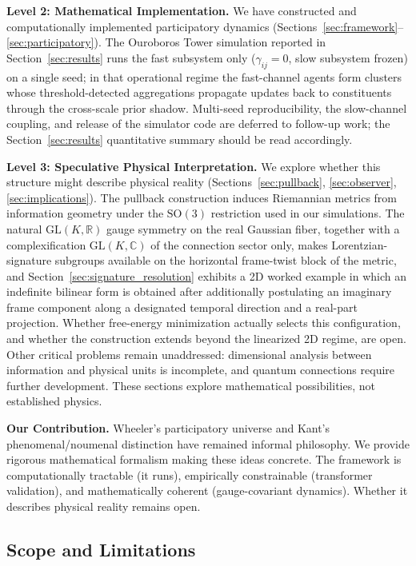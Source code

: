 \documentclass[11pt]{article}
\begin{document}
\textbf{Level 2: Mathematical Implementation.} We have constructed and computationally implemented participatory dynamics (Sections~\ref{sec:framework}--\ref{sec:participatory}). The Ouroboros Tower simulation reported in Section~\ref{sec:results} runs the fast subsystem only ($\gamma_{ij} = 0$, slow subsystem frozen) on a single seed; in that operational regime the fast-channel agents form clusters whose threshold-detected aggregations propagate updates back to constituents through the cross-scale prior shadow. Multi-seed reproducibility, the slow-channel coupling, and release of the simulator code are deferred to follow-up work; the Section~\ref{sec:results} quantitative summary should be read accordingly.

\textbf{Level 3: Speculative Physical Interpretation.} We explore whether this structure might describe physical reality (Sections~\ref{sec:pullback}, \ref{sec:observer}, \ref{sec:implications}). The pullback construction induces Riemannian metrics from information geometry under the $\mathrm{SO}(3)$ restriction used in our simulations. The natural $\mathrm{GL}(K, \mathbb{R})$ gauge symmetry on the real Gaussian fiber, together with a complexification $\mathrm{GL}(K, \mathbb{C})$ of the connection sector only, makes Lorentzian-signature subgroups available on the horizontal frame-twist block of the metric, and Section~\ref{sec:signature_resolution} exhibits a 2D worked example in which an indefinite bilinear form is obtained after additionally postulating an imaginary frame component along a designated temporal direction and a real-part projection. Whether free-energy minimization actually selects this configuration, and whether the construction extends beyond the linearized 2D regime, are open. Other critical problems remain unaddressed: dimensional analysis between information and physical units is incomplete, and quantum connections require further development. These sections explore mathematical possibilities, not established physics.

\textbf{Our Contribution.} Wheeler's participatory universe and Kant's phenomenal/noumenal distinction have remained informal philosophy. We provide rigorous mathematical formalism making these ideas concrete. The framework is computationally tractable (it runs), empirically constrainable (transformer validation), and mathematically coherent (gauge-covariant dynamics). Whether it describes physical reality remains open.

\subsection{Scope and Limitations}
\label{sec:scope_limitations}
\end{document}
